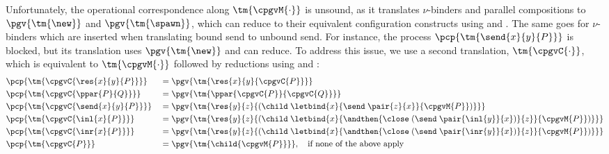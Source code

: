 Unfortunately, the operational correspondence along $\tm{\cpgvM{\cdot}}$ is unsound, as it translates $\nu$-binders and parallel compositions to $\pgv{\tm{\new}}$ and $\pgv{\tm{\spawn}}$, which can reduce to their equivalent configuration constructs using  and . The same goes for $\nu$-binders which are inserted when translating bound send to unbound send. For instance, the process $\pcp{\tm{\send{x}{y}{P}}}$ is blocked, but its translation uses $\pgv{\tm{\new}}$ and can reduce. To address this issue, we use a second translation, $\tm{\cpgvC{\cdot}}$, which is equivalent to $\tm{\cpgvM{\cdot}}$ followed by reductions using  and :
\begin{align*}
   & \pcp{\tm{\cpgvC{\res{x}{y}{P}}}}
   &                                   & = \pgv{\tm{\res{x}{y}{\cpgvC{P}}}}
  \\
   & \pcp{\tm{\cpgvC{\ppar{P}{Q}}}}
   &                                   & = \pgv{\tm{\ppar{\cpgvC{P}}{\cpgvC{Q}}}}
  \\
   & \pcp{\tm{\cpgvC{\send{x}{y}{P}}}}
   &                                   & = \pgv{\tm{\res{y}{z}{(\child\;\letbind{x}{\send\;\pair{z}{x}}{\cpgvM{P}})}}}
  \\
   & \pcp{\tm{\cpgvC{\inl{x}{P}}}}
   &                                   & = \pgv{\tm{\res{y}{z}{(\child\;\letbind{x}{\andthen{\close\;(\send\;\pair{\inl{y}}{x})}{z}}{\cpgvM{P}})}}}
  \\
   & \pcp{\tm{\cpgvC{\inr{x}{P}}}}
   &                                   & = \pgv{\tm{\res{y}{z}{(\child\;\letbind{x}{\andthen{\close\;(\send\;\pair{\inr{y}}{x})}{z}}{\cpgvM{P}})}}}
  \\
   & \pcp{\tm{\cpgvC{P}}}
   &                                   & = \pgv{\tm{\child{\cpgvM{P}}}},\quad\text{if none of the above apply}
\end{align*}

